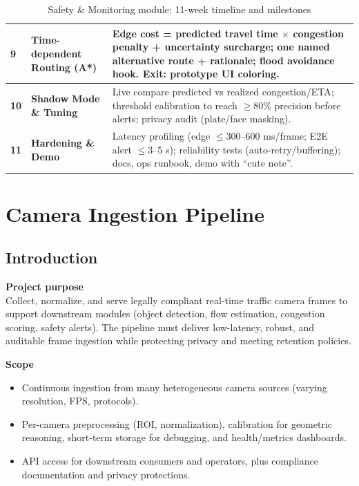 \begin{table}[H]
\begin{tabularx}{\textwidth}{|>{\raggedright}p{1.6cm}|>{\raggedright}p{3.7cm}|>{\raggedright\arraybackslash}X|}
    \hline
    \textbf{9} & \textbf{Time-dependent Routing (A*)} &
    Edge cost = predicted travel time $\times$ congestion penalty + uncertainty surcharge; one named alternative route + rationale; flood avoidance hook. Exit: prototype UI coloring. \\
    \hline
    \textbf{10} & \textbf{Shadow Mode \& Tuning} &
    Live compare predicted vs realized congestion/ETA; threshold calibration to reach $\ge$80\% precision before alerts; privacy audit (plate/face masking). \\
    \hline
    \textbf{11} & \textbf{Hardening \& Demo} &
    Latency profiling (edge $\le$300–600 ms/frame; E2E alert $\le$3–5 s); reliability tests (auto-retry/buffering); docs, ops runbook, demo with “cute note”. \\
    \hline
  \end{tabularx}
  \caption{Safety \& Monitoring module: 11-week timeline and milestones}
  \label{tab:safety-monitoring-timeline}
\end{table}



\section{Camera Ingestion Pipeline}
\label{sec:camera-ingestion}
\subsection{Introduction}
			\textbf{Project purpose}\\
Collect, normalize, and serve legally compliant real-time traffic camera frames to support downstream modules (object detection, flow estimation, congestion scoring, safety alerts). The pipeline must deliver low-latency, robust, and auditable frame ingestion while protecting privacy and meeting retention policies.

\vspace{0.5em}
			\textbf{Scope}
\begin{itemize}
  \item Continuous ingestion from many heterogeneous camera sources (varying resolution, FPS, protocols).
  \item Per-camera preprocessing (ROI, normalization), calibration for geometric reasoning, short-term storage for debugging, and health/metrics dashboards.
  \item API access for downstream consumers and operators, plus compliance documentation and privacy protections.
\end{itemize}

